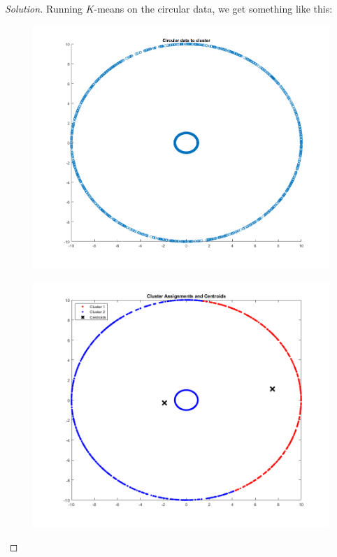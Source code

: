 \documentclass[10pt]{article}
\begin{document}
\begin{proof}[Solution]

Running $K$-means on the circular data, we get something like this:

\begin{figure}[H]
\centering
\begin{minipage}{.5\textwidth}
  \centering
  \includegraphics[width=\linewidth]{k_means_circular_raw_points}
  \label{fig:test1}
\end{minipage}%
\begin{minipage}{.5\textwidth}
  \centering
  \includegraphics[width=\linewidth]{k_means_circular_with_assignment}
  \label{fig:test2}
\end{minipage}
\end{figure}


\end{proof}
\end{document}
